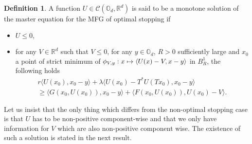 \documentclass[JEP,XML,SOM,Unicode,NoEqCountersInSection,published]{cedram}
\let\mathcal\mathscr
\newcommand\mto{\mathchoice{\longmapsto}{\mapsto}{\mapsto}{\mapsto}}
\theoremstyle{definition}
\newtheorem{Def}{Definition}[section]
\begin{document}
\begin{Def}\label{defmonstop}
A function $U \in \mathcal{C}(\mathbb{O}_d, \mathbb{R}^d)$ is said to be a monotone solution of the master equation for the MFG of optimal stopping if
\begin{itemize}
\item $U \leq 0$,
\item for any $V \in \mathbb{R}^d$ such that $V \leq 0$, for any $y \in \mathbb{O}_d$, $R>0$ sufficiently large and $x_0$ a point of strict minimum of $\phi_{V,y}: x \mto \langle U(x)-V, x-y\rangle$ in $B^1_R$, the following holds
\begin{multline*}
r \langle U (x_0), x_0-y \rangle+\lambda \langle U(x_0)-T^*U(Tx_0),x_0-y\rangle \\
\geq
\langle G(x_0,U(x_0)), x_0- y \rangle+\langle F(x_0,U(x_0)), U(x_0)-V \rangle.
\end{multline*}
\end{itemize}
\end{Def}
Let us insist that the only thing which differs from the non-optimal stopping case is that $U$ has to be non-positive component-wise and that we only have information for $V$ which are also non-positive component wise. The existence of such a solution is stated in the next result.
\end{document}
